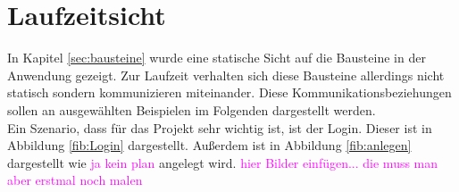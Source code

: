 \chapter{Laufzeitsicht}
In Kapitel \ref{sec:bausteine} wurde eine statische Sicht auf die Bausteine in der Anwendung gezeigt. Zur Laufzeit verhalten sich diese Bausteine allerdings nicht statisch sondern kommunizieren miteinander. Diese Kommunikationsbeziehungen sollen an ausgewählten Beispielen im Folgenden dargestellt werden.\\
Ein Szenario, dass für das Projekt sehr wichtig ist, ist der Login. Dieser ist in Abbildung \ref{fib:Login} dargestellt. 
Außerdem ist in Abbildung \ref{fib:anlegen} dargestellt wie \textcolor{magenta}{ja kein plan} angelegt wird.
\textcolor{magenta}{hier Bilder einfügen... die muss man aber erstmal noch malen}